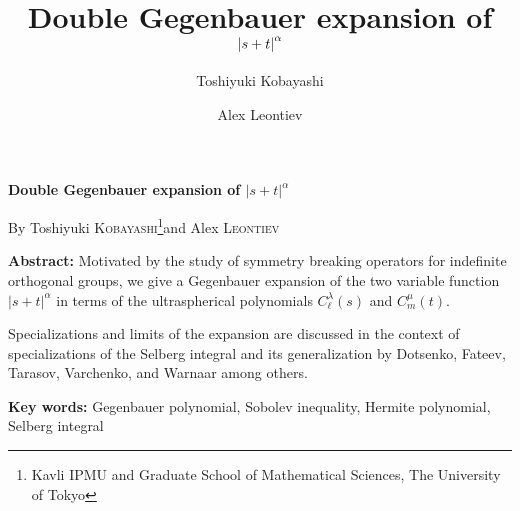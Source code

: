 \documentclass[12pt]{article}
\title{\bf Double Gegenbauer expansion of $\myabs{s+t}^\alpha$}
\author{Toshiyuki Kobayashi \and Alex Leontiev}
\newcommand{\myabs}[1]{\left|#1\right|}
\numberwithin{equation}{section}
\newcommand{\mygrammarfootnote}[1]{}
\begin{document}
\makeatletter
\renewcommand{\thefootnote}{\ifcase\value{footnote}\or*)\or
**)\or(***)\or(****)\or(\#)\or(\#\#)\or(\#\#\#)\or(\#\#\#\#)\or($\infty$)\fi}
\makeatother

    \begin{center}
        {\large\bf Double Gegenbauer expansion of $\myabs{s+t}^\alpha$\par}
\vspace{1em}
{\small By Toshiyuki \textsc{Kobayashi}\footnote{Kavli IPMU and Graduate School of Mathematical Sciences, The University of Tokyo}\footnotemark and Alex \textsc{Leontiev}\footnotemark[\value{footnote}]}
\end{center}
\vspace{2\baselineskip}
\renewcommand{\thefootnote}{\arabic{footnote}}
{
{
	\hspace{1.5cm}\begin{minipage}[]{0.8\textwidth}
  \quad\textbf{Abstract:}\quad
  Motivated by the study of symmetry breaking operators for indefinite
  orthogonal groups, we give a Gegenbauer expansion of the two variable
  function $| s + t |^{\alpha}$ in terms of the ultraspherical polynomials
  $C_{\ell}^{\lambda} (s)$ and $C^{\mu}_m (t)$.
  
  Specializations and limits of the expansion are discussed in the context of
  specializations of the Selberg integral and its
  generalization\mygrammarfootnote{maybe, ``generalization'' should be in plural (i.e.
  ``generalizations'')?} by Dotsenko, Fateev, Tarasov, Varchenko, and Warnaar
  among others.

\quad\textbf{Key words:}\quad
Gegenbauer polynomial, Sobolev inequality, Hermite polynomial, Selberg integral\mygrammarfootnote{maybe, dot here?}
\end{minipage}
}}
\end{document}
